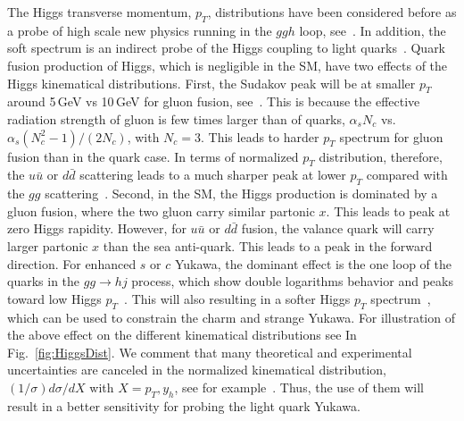\documentclass[../report.tex]{subfiles}
\begin{document}
The Higgs transverse momentum, $p_T$, distributions have been considered before as a probe of high scale new physics running in the $ggh$ loop, see~\cite{Arnesen:2008fb,Biekotter:2016ecg,Brehmer:2015rna,Dawson:2015gka,Schlaffer:2014osa,Grojean:2013nya,Langenegger:2015lra,Bramante:2014hua,Buschmann:2014twa,Azatov:2013xha,Banfi:2013yoa,Buschmann:2014sia}. 
In addition, the soft spectrum is an indirect probe of the Higgs coupling to light quarks~\cite{Soreq:2016rae,Bishara:2016jga}. 
Quark fusion production of Higgs, which is negligible in the SM, have two effects of the Higgs kinematical distributions. 
%
First, the Sudakov peak will be at smaller $p_T$ around 5\,GeV vs 10\,GeV for gluon fusion, see~\cite{Collins:1984kg}. This is because the effective radiation strength of gluon is few times larger than of quarks, $\alpha_s N_c$ vs. $\alpha_s (N^2_c-1)/(2N_c)$, with $N_c=3$. This leads to harder $p_T$ spectrum for gluon fusion than in the quark case. 
In terms of normalized $p_T$ distribution, therefore, the $u\bar{u}$ or $d\bar{d}$ scattering leads to a much sharper peak at lower $p_T$ compared with the $gg$ scattering~\cite{Soreq:2016rae}.
Second, in the SM, the Higgs production is dominated by a gluon fusion, where the two gluon carry similar partonic $x$. This leads to peak at zero Higgs rapidity. However, for $u\bar u$ or $d\bar d$ fusion, the valance quark will carry larger partonic $x$ than the sea anti-quark. This leads to a peak in the forward direction. 
%
For enhanced $s$ or $c$ Yukawa, the dominant effect is the one loop of the quarks in the $gg\to hj$ process, which show double logarithms behavior and peaks toward low Higgs $p_T$~\cite{Baur:1989cm}. This will also resulting in a softer Higgs $p_T$ spectrum~\cite{Bishara:2016jga}, which can be used to constrain the charm and strange Yukawa. 
%
For illustration of the above effect on the different kinematical distributions see In Fig.~\ref{fig:HiggsDist}. 
We comment that many theoretical and experimental uncertainties are canceled in  the normalized kinematical distribution, $(1/\sigma)d\sigma/dX$ with $X=p_T, y_h$, see for example~\cite{Soreq:2016rae}.
Thus, the use of them will result in a better sensitivity for probing the light quark Yukawa. 
\end{document}

